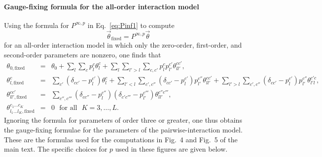 \documentclass{article}
\numberwithin{myclaim}{section}
\newcommand{\eq}[1]{Eq.\ \ref{#1}}
\newcommand{\todo}[1]{\textcolor{red}{[#1]}}
\newcommand{\myfixed}{\mathrm{fixed}}
\begin{document}



\paragraph*{Gauge-fixing formula for the all-order interaction model}
Using the formula for $P^{\infty,p}$ in \eq{eq:Pinf1} to compute 
\begin{equation}
	\vec{\theta}_\myfixed = P^{\infty,p} \vec{\theta}
\end{equation}
for an all-order interaction model in which only the zero-order, first-order, and second-order parameters are nonzero, one finds that
\begin{eqnarray}
\theta_{0,\myfixed} &=& \theta_0 + \sum_l \sum_c p_l^c \theta_l^c + \sum_l \sum_{l'>l} \sum_{c,c'} p_l^c p_{l'}^{c'} \theta_{ll'}^{cc'},  \\
\theta^{c}_{l,\myfixed} &=& \sum_{c'} (\delta_{c c'} - p_l^{c'})\theta_l^c + \sum_{l'<l} \sum_{c',c''} (\delta_{c c'} - p_l^{c'}) p_{l'}^{c''} \theta_{ll'}^{c c'} + \sum_{l'>l} \sum_{c',c''} (\delta_{c c'} - p_l^{c'}) p_{l'}^{c''} \theta_{l'l}^{c' c},  \\ 
\theta^{cc'}_{ll',\myfixed} &=& \sum_{c'',c'''} (\delta_{c c''} - p_l^{c''})(\delta_{c' c'''} - p_{l'}^{c'''}) \theta_{l l'}^{c'' c'''},\\
\theta^{c_1\ldots c_K}_{l_1 \ldots l_K,\myfixed}\!\!\!\!\!&=&0~~~\textrm{for all}~~~K = 3, \ldots, L.
\end{eqnarray}
Ignoring the formula for parameters of order three or greater, one thus obtains the gauge-fixing formulae for the parameters of the pairwise-interaction model. These are the formulas used for the computations in Fig.\ 4 and Fig.\ 5 of the main text. The specific choices for $p$ used in these figures are given below.
\end{document}
